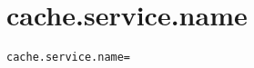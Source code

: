 \section{cache.service.name}
\label{configuration:CacheServiceName}
\AvailableInCsharpOnly{\TODO}
\begin{lstlisting}[style=Props,caption={Usage example for \textit{cache.service.name}}]
cache.service.name=
\end{lstlisting}